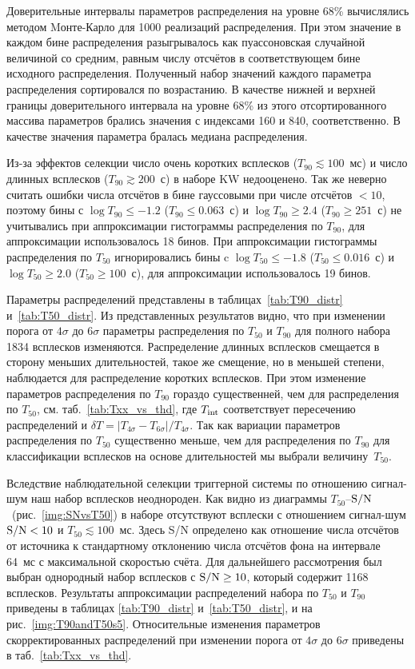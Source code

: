 Доверительные интервалы параметров распределения на уровне 68\% вычислялись 
методом Mонте-Карло для 1000 реализаций распределения. При этом значение в каждом 
бине распределения разыгрывалось как пуассоновская случайной величиной со средним, равным 
числу отсчётов в соответствующем бине исходного распределения. Полученный набор 
значений каждого параметра распределения сортировался по возрастанию. В качестве нижней и верхней 
границы доверительного интервала на уровне 68\% из этого отсортированного массива 
параметров брались значения с индексами 160 и 840, соответственно. 
В качестве значения параметра бралась медиана распределения.

Из-за эффектов селекции число очень коротких всплесков ($T_{90} \lesssim 100$~мс) и 
число длинных всплесков ($T_{90} \gtrsim 200$~с) в наборе KW недооценено. Так же неверно 
считать ошибки числа отсчётов в бине гауссовыми при числе отсчётов $<10$, поэтому 
бины с $\log T_{90} \leq -1.2$ ($T_{90} \leq 0.063$~с) и $\log T_{90} \geq 2.4$ ($T_{90} \geq 251$~с) 
не учитывались при аппроксимации гистограммы распределения по $T_{90}$,  для аппроксимации 
использовалось 18 бинов. При аппроксимации гистограммы распределения по $T_{50}$ игнорировались 
бины c $\log T_{50} \leq -1.8$ ($T_{50} \leq 0.016$~с) и  $\log T_{50} \geq 2.0$ 
($T_{50} \geq 100$~с), для аппроксимации использовалось 19 бинов.

Параметры распределений представлены в таблицах~\ref{tab:T90_distr} и~\ref{tab:T50_distr}. 
Из представленных результатов видно, что при изменении порога от $4\sigma$ до $6\sigma$ 
параметры распределения по $T_{50}$ и $T_{90}$ для полного набора 1834 всплесков изменяются. 
Распределение длинных всплесков смещается в сторону меньших длительностей, такое же смещение, 
но в меньшей степени, наблюдается для распределение коротких всплесков. 
При этом изменение параметров распределения по $T_{90}$ гораздо существенней, 
чем для распределения по $T_{50}$, см. таб.~\ref{tab:Txx_vs_thd},
где $T_{{\mathrm{int}}}$ соответствует пересечению распределений и 
$\delta T =|T_{4\sigma}-T_{6\sigma}| / T_{4\sigma}$. 
Так как вариации параметров распределения по $T_{50}$ существенно меньше, 
чем для распределения по $T_{90}$ для классификации всплесков на основе длительностей 
мы выбрали величину~$T_{50}$. 



Вследствие наблюдательной селекции триггерной системы по отношению сигнал-шум 
наш набор всплесков неоднороден. Как видно из диаграммы $T_{50}$--${\mathrm{S/N}}$~(рис.~\ref{img:SNvsT50}) 
в наборе отсутствуют всплески с отношением сигнал-шум ${\mathrm{S/N}} < 10$ и $T_{50} \lesssim 100$~мс. 
Здесь S/N определено как отношение числа отсчётов от источника к стандартному отклонению 
числа отсчётов фона на интервале 64~мс с максимальной скоростью счёта. 
Для дальнейшего рассмотрения был выбран однородный набор всплесков с ${\mathrm{S/N}}\geq 10$, 
который содержит 1168 всплесков. 
Результаты аппроксимации распределений набора по $T_{50}$ и $T_{90}$ приведены в 
таблицах \ref{tab:T90_distr} и~\ref{tab:T50_distr}, и на рис.~\ref{img:T90andT50s5}. 
Относительные изменения параметров скорректированных распределений при изменении 
порога от $4\sigma$ до $6\sigma$ приведены в таб.~\ref{tab:Txx_vs_thd}. 

